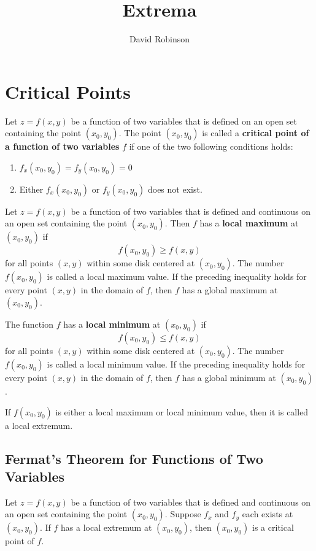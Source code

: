 \documentclass{article}
\title{Extrema}
\author{David Robinson}
\date{}
\begin{document}
\maketitle

\section*{Critical Points}

Let $z=f(x,y)$ be a function of two variables that is defined on an open set containing the point $(x_0,y_0)$. The point $(x_0,y_0)$ is called a \textbf{critical point of a function of two variables} $f$ if one of the two following conditions holds:
\begin{enumerate}
    \item $f_x(x_0,y_0)=f_y(x_0,y_0)=0$
    \item Either $f_x(x_0,y_0)$ or $f_y(x_0,y_0)$ does not exist.
\end{enumerate}

Let $z=f(x,y)$ be a function of two variables that is defined and continuous on an open set containing the point $(x_0,y_0)$. Then $f$ has a \textbf{local maximum} at $(x_0,y_0)$ if
\[f(x_0,y_0)\geq f(x,y)\]
for all points $(x,y)$ within some disk centered at $(x_0,y_0)$. The number $f(x_0,y_0)$ is called a local maximum value. If the preceding inequality holds for every point $(x,y)$ in the domain of $f$, then $f$ has a global maximum at $(x_0,y_0)$.
\vspace{1em}

The function $f$ has a \textbf{local minimum} at $(x_0,y_0)$ if
\[f(x_0,y_0)\leq f(x,y)\]
for all points $(x,y)$ within some disk centered at $(x_0,y_0)$. The number $f(x_0,y_0)$ is called a local minimum value. If the preceding inequality holds for every point $(x,y)$ in the domain of $f$, then $f$ has a global minimum at $(x_0,y_0)$.
\vspace{1em}

If $f(x_0,y_0)$ is either a local maximum or local minimum value, then it is called a local extremum.

\subsection*{Fermat's Theorem for Functions of Two Variables}

Let $z=f(x,y)$ be a function of two variables that is defined and continuous on an open set containing the point $(x_0,y_0)$. Suppose $f_x$ and $f_y$ each exists at $(x_0,y_0)$. If $f$ has a local extremum at $(x_0,y_0)$, then $(x_0,y_0)$ is a critical point of $f$.
\vspace{1em}
\end{document}
